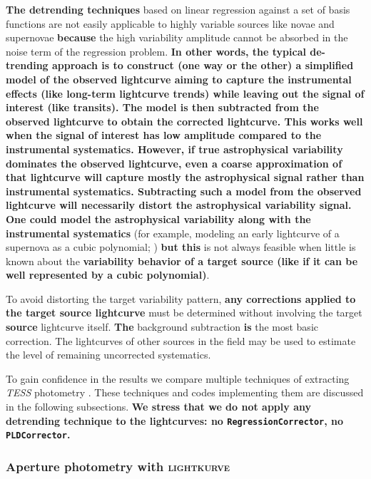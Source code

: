 \documentclass[twocolumn]{aastex631}
\begin{document}
{\bf The %
detrending techniques} based on linear regression against 
a set of basis functions are not easily applicable to highly variable sources like 
novae and supernovae \citep[e.g.,][]{2021MNRAS.500.5639V}  
{\bf because} 
the high variability amplitude cannot be absorbed in 
the noise term of the regression problem. 
{\bf In other words, the typical de-trending approach is to construct 
(one way or the other) 
a simplified model of the observed lightcurve aiming to capture the
instrumental effects (like long-term lightcurve trends) while leaving out the
signal of interest (like transits). The model is then subtracted from the
observed lightcurve to obtain the corrected lightcurve. This works well when
the signal of interest has low amplitude compared to the instrumental
systematics. However, if true astrophysical variability dominates 
the observed lightcurve, even a coarse approximation of that lightcurve will
capture mostly the astrophysical signal rather than instrumental
systematics. Subtracting such a model from the observed lightcurve will
necessarily distort the astrophysical variability signal.
One could model the astrophysical variability
along with the instrumental systematics} 
(for example, modeling an early lightcurve of a supernova as a cubic polynomial;
\citealt{2022AJ....163..284H}) %
{\bf but this} is not always feasible when little 
is known about the {\bf variability behavior of a target source (like if it
can be well represented by a cubic polynomial)}.
 
To avoid distorting the target variability pattern, 
{\bf any corrections applied to the target source lightcurve} must be determined without involving 
the target {\bf source} lightcurve itself.
{\bf The} background subtraction {\bf is} the most basic correction. 
The lightcurves of other sources in the field may be used to estimate the level of remaining uncorrected systematics.

To gain confidence in the results we compare multiple techniques of extracting {\em TESS} photometry 
\citep[the approach also adopted by][]{2023AAS...24136026P}. 
These techniques and codes implementing them are discussed in the following subsections.
{\bf We stress that we do not apply any detrending technique to the
lightcurves: no \texttt{RegressionCorrector}, no \texttt{PLDCorrector}.}

\subsubsection{Aperture photometry with \textsc{lightkurve}}
\label{sec:obstesslk}
\end{document}
